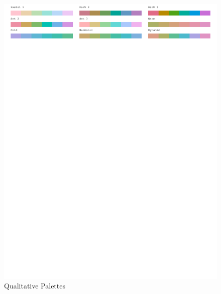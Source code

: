 \begin{figure}[H]
\centering
\includegraphics[width = \textwidth, trim= 0 9.5in 0 0, clip]{graphics/appFigs/hcl_pals_qual.pdf}
\caption{Qualitative Palettes}
\end{figure}

\vfill

